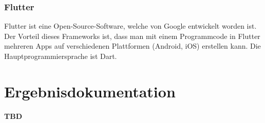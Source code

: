 \subsection{Flutter}
Flutter ist eine Open-Source-Software, welche von Google entwickelt worden ist. Der Vorteil dieses Frameworks ist, dass man mit einem Programmcode in Flutter mehreren Apps auf verschiedenen Plattformen (Android, iOS) erstellen kann. Die Hauptprogrammiersprache ist Dart. \cite{Flutter}


\chapter{Ergebnisdokumentation}
\textbf{TBD}


